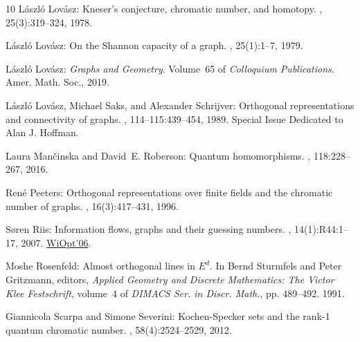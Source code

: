 \documentclass[11pt]{article}
\numberwithin{equation}{section}
\theoremstyle{definition}
\theoremstyle{plain}
\begin{document}
\begin{thebibliography}{10}
{\sc L{\'{a}}szl{\'{o}} Lov{\'{a}}sz}: Kneser's conjecture, chromatic number,
  and homotopy.
, 25(3):319--324, 1978.
\newblock [\epfmtdoi{10.1016/0097-3165(78)90022-5}]

{\sc L{\'a}szl{\'o} Lov{\'a}sz}: On the {S}hannon capacity of a graph.
, 25(1):1--7, 1979.

{\sc L{\'{a}}szl{\'{o}} Lov{\'{a}}sz}: {\em Graphs and Geometry}.
\newblock Volume~65 of {\em Colloquium Publications}.
\newblock Amer. Math. Soc., 2019.

{\sc L{\'{a}}szl{\'{o}} Lov{\'{a}}sz, Michael Saks, and Alexander Schrijver}:
  Orthogonal representations and connectivity of graphs.
, 114--115:439--454, 1989.
\newblock Special Issue Dedicated to Alan J. Hoffman.
\newblock [\epfmtdoi{10.1016/0024-3795(89)90475-8}]

{\sc Laura Man{\v{c}}inska and David~E. Roberson}: Quantum homomorphisms.
, 118:228--267, 2016.

{\sc Ren{\'e} Peeters}: Orthogonal representations over finite fields and the
  chromatic number of graphs.
, 16(3):417--431, 1996.
\newblock [\epfmtdoi{10.1007/BF01261326}]

{\sc S{\o}ren Riis}: Information flows, graphs and their guessing numbers.
, 14(1):R44:1--17, 2007.
\newblock \prelim \href{https:doi.org/10.1109/WIOPT.2006.1666516}{WiOpt'06}.
\newblock [\epfmtdoi{10.37236/962}]

{\sc Moshe Rosenfeld}: Almost orthogonal lines in ${E}^d$.
\newblock In {\sc Bernd Sturmfels and Peter Gritzmann}, editors, {\em Applied
  Geometry and Discrete Mathematics: The Victor Klee Festschrift}, volume~4 of
  {\em DIMACS Ser. in Discr. Math.}, pp. 489--492. 1991.

{\sc Giannicola Scarpa and Simone Severini}: {K}ochen-{S}pecker sets and the
  rank-1 quantum chromatic number.
, 58(4):2524--2529, 2012.


\end{thebibliography}
\end{document}
